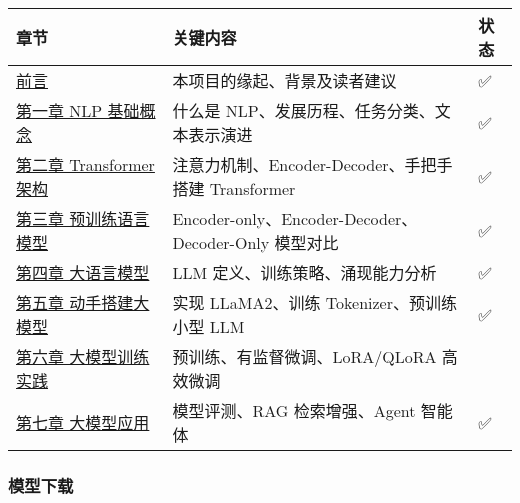 \documentclass[
]{article}
\begin{document}
\begin{longtable}[]{@{}
  >{\raggedright\arraybackslash}p{}
  >{\raggedright\arraybackslash}p{}
  >{\raggedright\arraybackslash}p{}@{}}
\toprule\noalign{}
\begin{minipage}[b]{\linewidth}\raggedright
章节
\end{minipage} & \begin{minipage}[b]{\linewidth}\raggedright
关键内容
\end{minipage} & \begin{minipage}[b]{\linewidth}\raggedright
状态
\end{minipage} \\
\midrule\noalign{}
\endhead
\bottomrule\noalign{}
\endlastfoot
\href{./前言.md}{前言} & 本项目的缘起、背景及读者建议 & ✅ \\
\href{./chapter1/第一章\%20NLP基础概念.md}{第一章 NLP 基础概念} & 什么是
NLP、发展历程、任务分类、文本表示演进 & ✅ \\
\href{./chapter2/第二章\%20Transformer架构.md}{第二章 Transformer 架构}
& 注意力机制、Encoder-Decoder、手把手搭建 Transformer & ✅ \\
\href{./chapter3/第三章\%20预训练语言模型.md}{第三章 预训练语言模型} &
Encoder-only、Encoder-Decoder、Decoder-Only 模型对比 & ✅ \\
\href{./chapter4/第四章\%20大语言模型.md}{第四章 大语言模型} & LLM
定义、训练策略、涌现能力分析 & ✅ \\
\href{./chapter5/第五章\%20动手搭建大模型.md}{第五章 动手搭建大模型} &
实现 LLaMA2、训练 Tokenizer、预训练小型 LLM & ✅ \\
\href{./chapter6/第六章\%20大模型训练流程实践.md}{第六章 大模型训练实践}
& 预训练、有监督微调、LoRA/QLoRA 高效微调 & 🚧 \\
\href{./chapter7/第七章\%20大模型应用.md}{第七章 大模型应用} &
模型评测、RAG 检索增强、Agent 智能体 & ✅ \\
\end{longtable}

\subsubsection{模型下载}\label{ux6a21ux578bux4e0bux8f7d}
\end{document}
